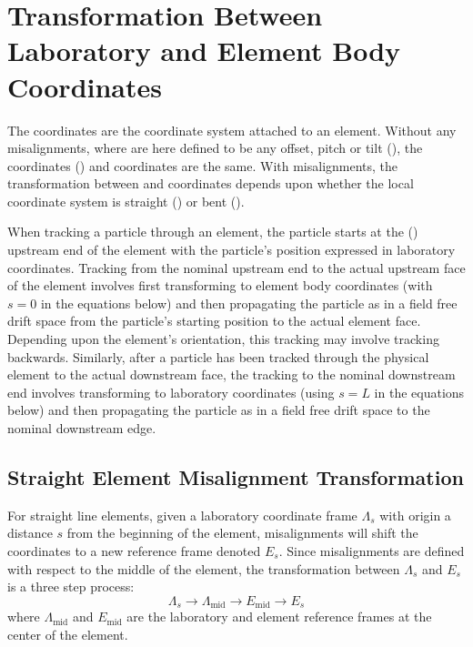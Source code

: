 
\section{Transformation Between Laboratory and Element Body Coordinates}
\label{s:lab.body.transform}

The  coordinates are the coordinate system attached to an element. Without any
misalignments, where  are here defined to be any offset, pitch or tilt
(), the  coordinates () and  coordinates
are the same. With misalignments, the transformation between  and 
coordinates depends upon whether the local coordinate system is straight () or
bent ().

When tracking a particle through an element, the particle starts at the 
() upstream end of the element with the particle's position expressed in laboratory
coordinates. Tracking from the nominal upstream end to the actual upstream face of the element
involves first transforming to element body coordinates (with $s = 0$ in the equations below) and
then propagating the particle as in a field free drift space from the particle's starting position
to the actual element face. Depending upon the element's orientation, this tracking may involve
tracking backwards. Similarly, after a particle has been tracked through the physical element to the
actual downstream face, the tracking to the nominal downstream end involves transforming to
laboratory coordinates (using $s = L$ in the equations below) and then propagating the particle as
in a field free drift space to the nominal downstream edge.

\subsection{Straight Element Misalignment Transformation}
\label{s:straight.mis}

For straight line elements, given a laboratory coordinate frame $\Lambda_s$ with origin a distance
$s$ from the beginning of the element, misalignments will shift the coordinates to a new reference
frame denoted $E_s$. Since misalignments are defined with respect to the middle of the element, the
transformation between $\Lambda_s$ and $E_s$ is a three step process:
\begin{equation}
  \Lambda_s \longrightarrow \Lambda_\text{mid} 
  \longrightarrow E_\text{mid} \longrightarrow E_s
  \label{llee}
\end{equation}
where $\Lambda_\text{mid}$ and $E_\text{mid}$ are the laboratory and element reference frames at the
center of the element.

